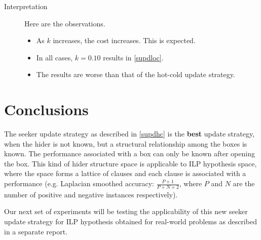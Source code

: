 \documentclass[11pt,a4paper]{article}
\begin{document}
\begin{description}
	\item[Interpretation] Here are the observations.
	\begin{itemize}
		\item As $k$ increases, the cost increases. This is expected.
		\item In all cases, $k = 0.10$ results in \ref{supdloc}.
		\item The results are worse than that of the hot-cold update strategy.
	\end{itemize}
	
\end{description}

\section{Conclusions}

The seeker update strategy as described in \ref{supdhc} is the \textbf{best} update strategy, when the hider is not known, but a structural relationship among the boxes is known. The performance 
associated with a box can only be known after opening the box. This kind of hider structure space is applicable to ILP hypothesis space, where the space forms a lattice of clauses and each clause is associated with a performance (e.g. Laplacian smoothed accuracy: $\frac{P+1}{P+N+2}$, where $P$ and $N$ are the number of positive and negative instances respectively).

Our next set of experiments will be testing the applicability of this new seeker update strategy for ILP hypothesis obtained for real-world problems as described in a separate report.

	
\end{document}
